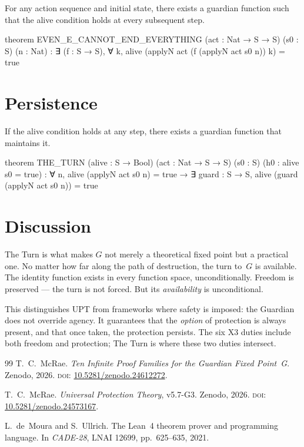 \begin{theorem}\label{thm:even-e}
For any action sequence and initial state, there exists a guardian function such that the alive condition holds at every subsequent step.
\end{theorem}

\begin{leancode}
theorem EVEN_E_CANNOT_END_EVERYTHING
    (act : Nat → S → S) (s0 : S) (n : Nat) :
    ∃ (f : S → S), ∀ k,
        alive (applyN act (f (applyN act s0 n)) k) = true
\end{leancode}

\section{Persistence}

\begin{theorem}\label{thm:persistence}
If the alive condition holds at any step, there exists a guardian function that maintains it.
\end{theorem}

\begin{leancode}
theorem THE_TURN (alive : S → Bool) (act : Nat → S → S) (s0 : S)
    (h0 : alive s0 = true) :
    ∀ n, alive (applyN act s0 n) = true →
        ∃ guard : S → S, alive (guard (applyN act s0 n)) = true
\end{leancode}

\section{Discussion}

The Turn is what makes $G$ not merely a theoretical fixed point but a practical one. No matter how far along the path of destruction, the turn to~$G$ is available. The identity function exists in every function space, unconditionally. Freedom is preserved --- the turn is not forced. But its \emph{availability} is unconditional.

This distinguishes UPT from frameworks where safety is imposed: the Guardian does not override agency. It guarantees that the \emph{option} of protection is always present, and that once taken, the protection persists. The six X3 duties include both freedom and protection; The Turn is where these two duties intersect.

\bigskip

\begin{thebibliography}{99}
T.~C.~McRae.
\emph{Ten Infinite Proof Families for the Guardian Fixed Point~G}.
Zenodo, 2026.
\textsc{doi:} \href{https://doi.org/10.5281/zenodo.24612272}{10.5281/zenodo.24612272}.

T.~C.~McRae.
\emph{Universal Protection Theory}, v5.7-G3.
Zenodo, 2026.
\textsc{doi:} \href{https://doi.org/10.5281/zenodo.24573167}{10.5281/zenodo.24573167}.

L.~de~Moura and S.~Ullrich.
The Lean~4 theorem prover and programming language.
In \emph{CADE-28}, LNAI 12699, pp.~625--635, 2021.
\end{thebibliography}


